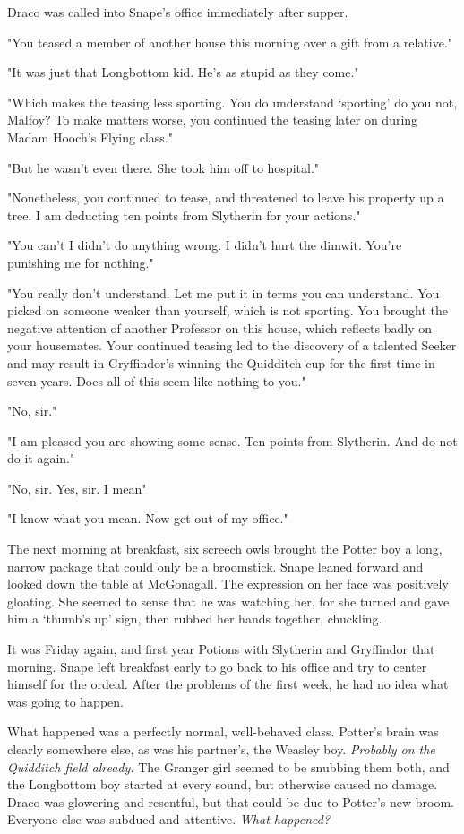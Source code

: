 Draco was called into Snape's office immediately after supper.

"You teased a member of another house this morning over a gift from a relative."

"It was just that Longbottom kid. He's as stupid as they come."

"Which makes the teasing less sporting. You do understand `sporting' do you not, Malfoy? To make matters worse, you continued the teasing later on during Madam Hooch's Flying class."

"But he wasn't even there. She took him off to hospital."

"Nonetheless, you continued to tease, and threatened to leave his property up a tree. I am deducting ten points from Slytherin for your actions."

"You can't{\el} I didn't do anything wrong. I didn't hurt the dimwit. You're punishing me for nothing."

"You really don't understand. Let me put it in terms you can understand. You picked on someone weaker than yourself, which is not sporting. You brought the negative attention of another Professor on this house, which reflects badly on your housemates. Your continued teasing led to the discovery of a talented Seeker and may result in Gryffindor's winning the Quidditch cup for the first time in seven years. Does all of this seem like nothing to you."

"No, sir."

"I am pleased you are showing some sense. Ten points from Slytherin. And do not do it again."

"No, sir. Yes, sir. I mean{\el}"

"I know what you mean. Now get out of my office."

The next morning at breakfast, six screech owls brought the Potter boy a long, narrow package that could only be a broomstick. Snape leaned forward and looked down the table at McGonagall. The expression on her face was positively gloating. She seemed to sense that he was watching her, for she turned and gave him a `thumb's up' sign, then rubbed her hands together, chuckling.

It was Friday again, and first year Potions with Slytherin and Gryffindor that morning. Snape left breakfast early to go back to his office and try to center himself for the ordeal. After the problems of the first week, he had no idea what was going to happen.

What happened was a perfectly normal, well-behaved class. Potter's brain was clearly somewhere else, as was his partner's, the Weasley boy. \emph{Probably on the Quidditch field already.} The Granger girl seemed to be snubbing them both, and the Longbottom boy started at every sound, but otherwise caused no damage. Draco was glowering and resentful, but that could be due to Potter's new broom. Everyone else was subdued and attentive. \emph{What happened?}

